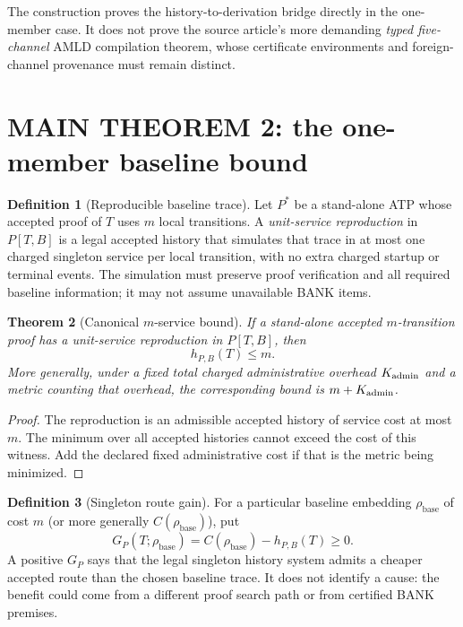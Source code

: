 \documentclass[11pt]{article}
\newtheorem{theorem}{Theorem}[section]
\theoremstyle{definition}
\newtheorem{definition}[theorem]{Definition}
\begin{document}
The construction proves the history-to-derivation bridge directly in the one-member case. It does not prove the source article's more demanding \emph{typed five-channel} AMLD compilation theorem, whose certificate environments and foreign-channel provenance must remain distinct.

\section{MAIN THEOREM 2: the one-member baseline bound}
\begin{definition}[Reproducible baseline trace]
Let $P^*$ be a stand-alone ATP whose accepted proof of $T$ uses $m$ local transitions. A \emph{unit-service reproduction} in $P[T,B]$ is a legal accepted history that simulates that trace in at most one charged singleton service per local transition, with no extra charged startup or terminal events. The simulation must preserve proof verification and all required baseline information; it may not assume unavailable BANK items.
\end{definition}

\begin{theorem}[Canonical $m$-service bound]\label{thm:baseline}
If a stand-alone accepted $m$-transition proof has a unit-service reproduction in $P[T,B]$, then
\[
\boxed{h_{P,B}(T)\le m.}
\]
More generally, under a fixed total charged administrative overhead $K_{\rm admin}$ and a metric counting that overhead, the corresponding bound is $m+K_{\rm admin}$.
\end{theorem}
\begin{proof}
The reproduction is an admissible accepted history of service cost at most $m$. The minimum over all accepted histories cannot exceed the cost of this witness. Add the declared fixed administrative cost if that is the metric being minimized.
\end{proof}

\begin{definition}[Singleton route gain]
For a particular baseline embedding $\rho_{\mathrm{base}}$ of cost $m$ (or more generally $C(\rho_{\mathrm{base}})$), put
\[
G_P(T;\rho_{\mathrm{base}})=C(\rho_{\mathrm{base}})-h_{P,B}(T)\ge0.
\]
A positive $G_P$ says that the legal singleton history system admits a cheaper accepted route than the chosen baseline trace. It does not identify a cause: the benefit could come from a different proof search path or from certified BANK premises.
\end{definition}
\end{document}
